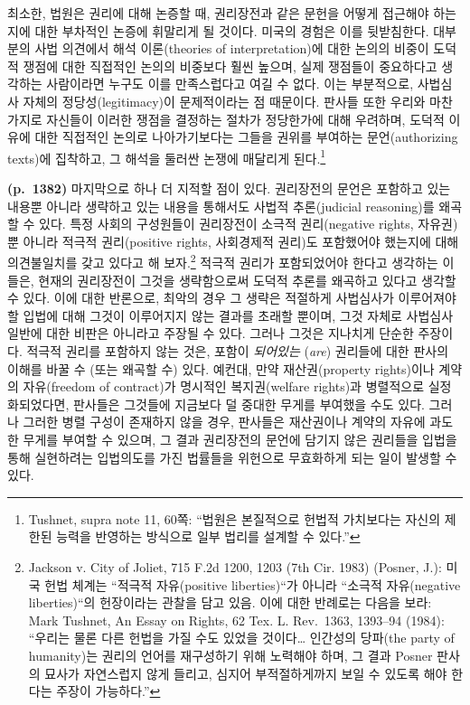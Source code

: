 \documentclass[a4paper,12pt,oneside]{article}  %
\newcommand{\emphksans}[1]{%
  {\kopubhangul\kopublatin\textsl{#1}}%
}
\begin{document}
최소한, 법원은 권리에 대해 논증할 때, 권리장전과 같은 문헌을 어떻게
접근해야 하는지에 대한 부차적인 논증에 휘말리게 될 것이다. 미국의 경험은
이를 뒷받침한다. 대부분의 사법 의견에서 해석 이론(theories of
interpretation)에 대한 논의의 비중이 도덕적 쟁점에 대한 직접적인 논의의
비중보다 훨씬 높으며, 실제 쟁점들이 중요하다고 생각하는 사람이라면
누구도 이를 만족스럽다고 여길 수 없다. 이는 부분적으로, 사법심사 자체의
정당성(legitimacy)이 문제적이라는 점 때문이다. 판사들 또한 우리와
마찬가지로 자신들이 이러한 쟁점을 결정하는 절차가 정당한가에 대해
우려하며, 도덕적 이유에 대한 직접적인 논의로 나아가기보다는 그들을
권위를 부여하는 문언(authorizing texts)에 집착하고, 그 해석을 둘러싼
논쟁에 매달리게 된다.\footnote{Tushnet, supra note 11, 60쪽: ``법원은
  본질적으로 헌법적 가치보다는 자신의 제한된 능력을 반영하는 방식으로
  일부 법리를 설계할 수 있다.''}

\textbf{(p.~1382)} 마지막으로 하나 더 지적할 점이 있다. 권리장전의
문언은 포함하고 있는 내용뿐 아니라 생략하고 있는 내용을 통해서도 사법적
추론(judicial reasoning)를 왜곡할 수 있다. 특정 사회의 구성원들이
권리장전이 소극적 권리(negative rights, 자유권)뿐 아니라 적극적
권리(positive rights, 사회경제적 권리)도 포함했어야 했는지에 대해
의견불일치를 갖고 있다고 해 보자.\footnote{Jackson v. City of Joliet,
  715 F.2d 1200, 1203 (7th Cir. 1983) (Posner, J.): 미국 헌법 체계는
  ``적극적 자유(positive liberties)``가 아니라 ``소극적 자유(negative
  liberties)``의 헌장이라는 관찰을 담고 있음. 이에 대한 반례로는 다음을
  보라: Mark Tushnet, An Essay on Rights, 62 Tex. L. Rev.~1363, 1393--94
  (1984): ``우리는 물론 다른 헌법을 가질 수도 있었을 것이다\ldots{}
  인간성의 당파(the party of humanity)는 권리의 언어를 재구성하기 위해
  노력해야 하며, 그 결과 Posner 판사의 묘사가 자연스럽지 않게 들리고,
  심지어 부적절하게까지 보일 수 있도록 해야 한다는 주장이 가능하다.''}
적극적 권리가 포함되었어야 한다고 생각하는 이들은, 현재의 권리장전이
그것을 생략함으로써 도덕적 추론를 왜곡하고 있다고 생각할 수 있다. 이에
대한 반론으로, 최악의 경우 그 생략은 적절하게 사법심사가 이루어져야 할
입법에 대해 그것이 이루어지지 않는 결과를 초래할 뿐이며, 그것 자체로
사법심사 일반에 대한 비판은 아니라고 주장될 수 있다. 그러나 그것은
지나치게 단순한 주장이다. 적극적 권리를 포함하지 않는 것은, 포함이
\emphksans{되어있는}(\emph{are}) 권리들에 대한 판사의 이해를 바꿀 수 (또는 왜곡할
수) 있다. 예컨대, 만약 재산권(property rights)이나 계약의 자유(freedom
of contract)가 명시적인 복지권(welfare rights)과 병렬적으로
실정화되었다면, 판사들은 그것들에 지금보다 덜 중대한 무게를 부여했을
수도 있다. 그러나 그러한 병렬 구성이 존재하지 않을 경우, 판사들은
재산권이나 계약의 자유에 과도한 무게를 부여할 수 있으며, 그 결과
권리장전의 문언에 담기지 않은 권리들을 입법을 통해 실현하려는 입법의도를
가진 법률들을 위헌으로 무효화하게 되는 일이 발생할 수 있다.
\end{document}
